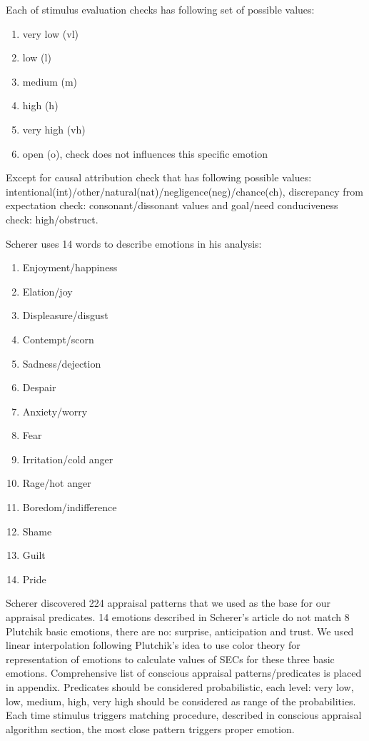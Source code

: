 Each of stimulus evaluation checks has following set of possible values:

\begin{enumerate}
	\item  very low (vl)
	\item  low (l)
	\item  medium (m)
	\item  high (h)
	\item  very high (vh)
	\item  open (o), check does not influences this specific emotion
\end{enumerate}

Except for causal attribution check that has following possible values: intentional(int)/other/natural(nat)/negligence(neg)/chance(ch),  discrepancy from expectation check: consonant/dissonant values and goal/need conduciveness check: high/obstruct.

Scherer uses 14 words to describe emotions in his analysis:

\begin{enumerate}
	\item  Enjoyment/happiness
	\item  Elation/joy
	\item  Displeasure/disgust
	\item  Contempt/scorn
	\item  Sadness/dejection
	\item  Despair
	\item  Anxiety/worry
	\item  Fear
	\item  Irritation/cold anger
	\item  Rage/hot anger
	\item  Boredom/indifference
	\item  Shame
	\item  Guilt
	\item  Pride
\end{enumerate}

Scherer discovered 224 appraisal patterns that we used as the base for our appraisal predicates. 14 emotions described in Scherer's article do not match 8 Plutchik basic emotions, there are no: surprise, anticipation and trust. We used linear interpolation following Plutchik's idea to use color theory for representation of emotions to calculate values of SECs for these three basic emotions. Comprehensive list of conscious appraisal patterns/predicates is placed in appendix. Predicates should be considered probabilistic, each level: very low, low, medium, high, very high should be considered as range of the probabilities. Each time stimulus triggers matching procedure, described in conscious appraisal algorithm section, the most close pattern triggers proper emotion.

